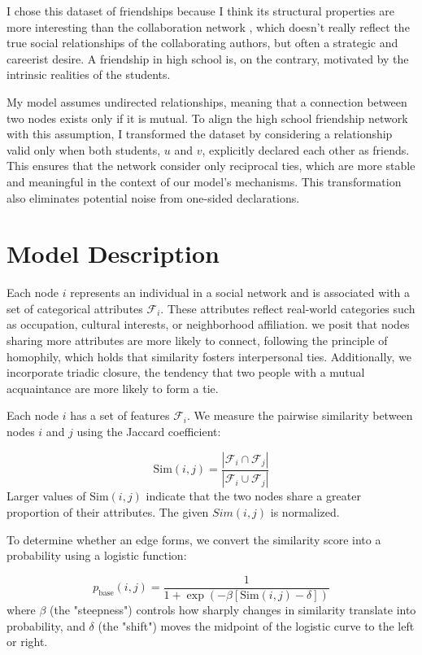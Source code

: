 \documentclass[runningheads]{llncs}
\begin{document}
I chose this dataset of friendships because I think its structural properties are more interesting than the collaboration network \cite{newman2001structure}, which doesn't really reflect the true social relationships of the collaborating authors, but often a strategic and careerist desire. A friendship in high school is, on the contrary, motivated by the intrinsic realities of the students.

My model assumes undirected relationships, meaning that a connection between two nodes exists only if it is mutual. To align the high school friendship network with this assumption, I transformed the dataset by considering a relationship valid only when both students, $u$ and $v$, explicitly declared each other as friends. This ensures that the network consider only reciprocal ties, which are more stable and meaningful in the context of our model's mechanisms. This transformation also eliminates potential noise from one-sided declarations.

\section{Model Description}

Each node $i$ represents an individual in a social network and is associated with a set of categorical attributes $\mathcal{F}_i$. These attributes reflect real-world categories such as occupation, cultural interests, or neighborhood affiliation. we posit that nodes sharing more attributes are more likely to connect, following the principle of homophily, which holds that similarity fosters interpersonal ties. Additionally, we incorporate triadic closure, the tendency that two people with a mutual acquaintance are more likely to form a tie.

Each node $i$ has a set of features $\mathcal{F}_i$. We measure the pairwise similarity between nodes $i$ and $j$ using the Jaccard coefficient:

\begin{equation}\label{eq:similarity}
\text{Sim}(i, j) = \frac{|\mathcal{F}_i \cap \mathcal{F}_j|}{|\mathcal{F}_i \cup \mathcal{F}_j|}
\end{equation}
Larger values of $\text{Sim}(i, j)$ indicate that the two nodes share a greater proportion of their attributes. The given $Sim(i, j)$ is normalized.

To determine whether an edge forms, we convert the similarity score into a probability using a logistic function:

\begin{equation}\label{eq:base_probability}
p_{\text{base}}(i, j) = \frac{1}{1 + \exp(-\beta[\text{Sim}(i, j) - \delta])}
\end{equation}
where $\beta$ (the "steepness") controls how sharply changes in similarity translate into probability, and $\delta$ (the "shift") moves the midpoint of the logistic curve to the left or right.
\end{document}
